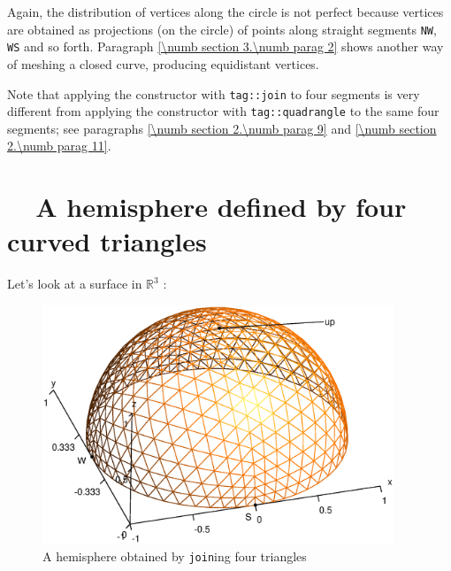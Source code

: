 Again, the distribution of vertices along the circle is not perfect
because vertices are obtained as projections (on the circle) of points
along straight segments {\small\tt NW}, {\small\tt WS} and so forth.
Paragraph \ref{\numb section 3.\numb parag 2} shows another way of meshing a closed curve,
producing equidistant vertices.

Note that applying the {\small\tt{}} constructor with {\small\tt\textcolor{tag}{tag}::join}
to four segments is very different from applying the {\small\tt{}} constructor with
{\small\tt\textcolor{tag}{tag}::quadrangle} to the same four segments;
see paragraphs \ref{\numb section 2.\numb parag 9} and \ref{\numb section 2.\numb parag 11}.


\section{~~A hemisphere defined by four curved triangles}\label{\numb section 2.\numb parag 6}

Let's look at a surface in $ \mathbb{R}^3 $ :

\begin{figure}[ht] \centering
  \includegraphics[width=105mm]{hemisphere}
  \caption{A hemisphere obtained by {\small\tt join}ing four triangles}
  \label{\numb section 2.\numb fig 6}
\end{figure}

